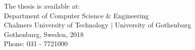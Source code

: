 \documentclass[10pt,a4paper,onecolumn,english]{book}
\newcommand{\currentyear}{2018}
\begin{document}
\begin{center}
The thesis is available at:\\
Department of Computer Science \& Engineering\\
Chalmers University of Technology $|$ University of Gothenburg\\
Gothenburg, Sweden, \currentyear\\
\vspace{1cm}
Phone: 031 - 7721000
\end{center}


\newpage
\thispagestyle{empty}


\end{document}
